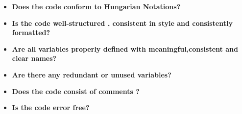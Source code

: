 \documentclass[openany,12pt]{report}
\begin{document}
		\begin{itemize}
			\item{\textbf{Does the code conform to Hungarian Notations?}}
			\item{\textbf{Is the code well-structured , consistent in style and consistently formatted?}}
			\item{\textbf{Are all variables properly defined with meaningful,consistent and clear names?}}
			\item{\textbf{Are there any redundant or unused variables?}}
			\item{\textbf{Does the code consist of comments ?}}
			\item{\textbf{Is the code error free?}}
			
		\end{itemize}
		
		
\end{document}

